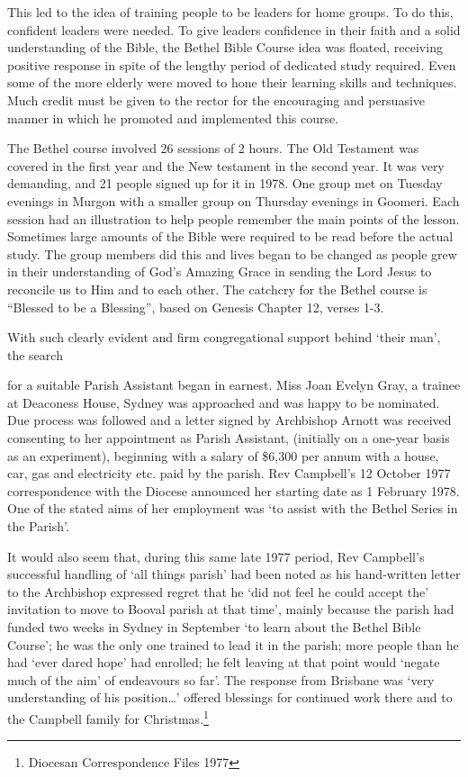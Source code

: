 This led to the idea of training people to be leaders for home groups.
To do this, confident leaders were needed. To give leaders confidence in
their faith and a solid understanding of the Bible, the Bethel Bible
Course idea was floated, receiving positive response in spite of the
lengthy period of dedicated study required. Even some of the more
elderly were moved to hone their learning skills and techniques. Much
credit must be given to the rector for the encouraging and persuasive
manner in which he promoted and implemented this course.

The Bethel course involved 26 sessions of 2  hours. The Old Testament
was covered in the first year and the New testament in the second year.
It was very demanding, and 21 people signed up for it in 1978. One group
met on Tuesday evenings in Murgon with a smaller group on Thursday
evenings in Goomeri. Each session had an illustration to help people
remember the main points of the lesson. Sometimes large amounts of the
Bible were required to be read before the actual study. The group
members did this and lives began to be changed as people grew in their
understanding of God's Amazing Grace in sending the Lord Jesus to
reconcile us to Him and to each other. The catchcry for the Bethel
course is ``Blessed to be a Blessing'', based on Genesis Chapter 12,
verses 1-3.

With such clearly evident and firm congregational support behind `their
man', the search

for a suitable Parish Assistant began in earnest. Miss Joan Evelyn Gray,
a trainee at Deaconess House, Sydney was approached and was happy to be
nominated. Due process was followed and a letter signed by Archbishop
Arnott was received consenting to her appointment as Parish Assistant,
(initially on a one-year basis as an experiment), beginning with a
salary of \$6,300 per annum with a house, car, gas and electricity etc.
paid by the parish. Rev Campbell's 12 October 1977 correspondence with
the Diocese announced her starting date as 1 February 1978. One of the
stated aims of her employment was `to assist with the Bethel Series in
the Parish'.

It would also seem that, during this same late 1977 period, Rev
Campbell's successful handling of `all things parish' had been noted as
his hand-written letter to the Archbishop expressed regret that he `did
not feel he could accept the' invitation to move to Booval parish at
that time', mainly because the parish had funded two weeks in Sydney in
September `to learn about the Bethel Bible Course'; he was the only one
trained to lead it in the parish; more people than he had `ever dared
hope' had enrolled; he felt leaving at that point would `negate much of
the aim' of endeavours so far'. The response from Brisbane was `very
understanding of his position\ldots' offered blessings for continued
work there and to the Campbell family for Christmas.\footnote{Diocesan
  Correspondence Files 1977}

